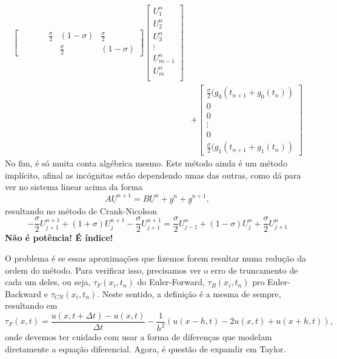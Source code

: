 \documentclass[../differential_methods.tex]{subfiles}
\begin{document}
\begin{align*}
\begin{bmatrix}
		                      &                   &                   &                   & \frac{\sigma }{2} & (1-\sigma )       & \frac{\sigma }{2} \\
		                      &                   &                   &                   &                   & \frac{\sigma }{2} & (1-\sigma )
	    \end{bmatrix}\begin{bmatrix}
		                 U_{1}^{n}   \\
		                 U_{2}^{n}   \\
		                 U_{3}^{n}   \\
		                 \vdots      \\
		                 U_{m-1}^{n} \\
		                 U_{m}^{n}   \\
	                 \end{bmatrix}        \\
	  & + \begin{bmatrix}
		      \frac{\sigma }{2} (g_{0}(t_{n+1}+g_{0}(t_{n})) \\
		      0                                              \\
		      0                                              \\
		      \vdots                                         \\
		      0                                              \\
		      \frac{\sigma }{2} (g_{1}(t_{n+1}+g_{1}(t_{n}))
	      \end{bmatrix}
\end{align*}
No fim, é só muita conta algébrica mesmo. Este método ainda é um método implícito, afinal as incógnitas estão dependendo umas das outras, como dá para ver no sistema linear acima da forma
\[
	A\underline{U}^{n+1} = B\underline{U}^{n} + \underline{g}^{n} + \underline{g}^{n+1},
\]
resultando no método de Crank-Nicolson
\[
	\boxed{-\frac{\sigma }{2}U_{j+1}^{n+1} + (1+\sigma )U_{j}^{n+1} -\frac{\sigma }{2}U_{j+1}^{n+1} = \frac{\sigma }{2}U_{j-1}^{n}+(1-\sigma )U_{j}^{n}+\frac{\sigma }{2}U_{j+1}^{n}}
\]
\textbf{Não é potência! É índice!}

O problema é se essas aproximações que fizemos forem resultar numa redução da ordem do método. Para verificar isso, precisamos ver o erro de truncamento de cada um deles, ou seja, \(\tau_{F}(x_{i}, t_{n})\) do Euler-Forward, \(\tau_{B}(x_{i}, t_{n})\) pro Euler-Backward e \(\tau_{CN}(x_{i}, t_{n})\).
Neste sentido, a definição é a mesma de sempre, resultando em
\[
	\tau_{F}(x, t) = \frac{u(x, t+\Delta t) - u(x, t)}{\Delta t} - \frac{1}{h^{2}}(u(x-h, t) - 2u(x, t) + u(x+h, t)),
\]
onde devemos ter cuidado com usar a forma de diferenças que modelam diretamente a equação diferencial. Agora, é questão de expandir em Taylor.
\end{document}
